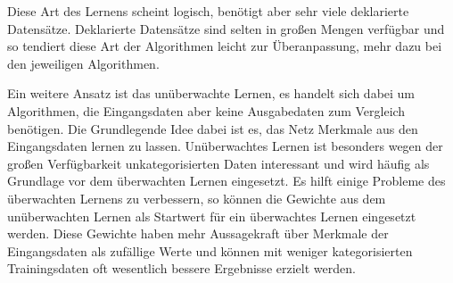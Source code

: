 Diese Art des Lernens scheint logisch, benötigt aber sehr viele deklarierte Datensätze. Deklarierte Datensätze sind selten in großen Mengen verfügbar und so tendiert diese Art der Algorithmen leicht zur Überanpassung, mehr dazu bei den jeweiligen Algorithmen.

Ein weitere Ansatz ist das unüberwachte Lernen, es handelt sich dabei um Algorithmen, die Eingangsdaten aber keine Ausgabedaten zum Vergleich benötigen. Die Grundlegende Idee dabei ist es, das Netz Merkmale aus den Eingangsdaten lernen zu lassen. Unüberwachtes Lernen ist besonders wegen der großen Verfügbarkeit unkategorisierten Daten interessant und wird häufig als Grundlage vor dem überwachten Lernen eingesetzt. Es hilft einige Probleme des überwachten Lernens zu verbessern, so können die Gewichte aus dem unüberwachten Lernen als Startwert für ein überwachtes Lernen eingesetzt werden. Diese Gewichte haben mehr Aussagekraft über Merkmale der Eingangsdaten als zufällige Werte und können mit weniger kategorisierten Trainingsdaten oft wesentlich bessere Ergebnisse erzielt werden.